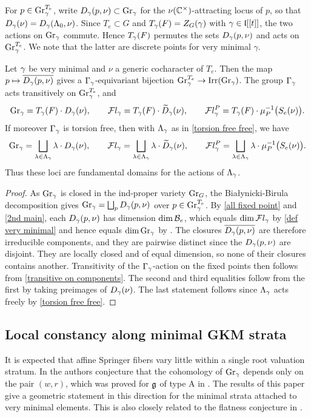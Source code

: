 \documentclass[11pt]{article}
\numberwithin{equation}{section}
\begin{document}
For $p\in\operatorname{Gr}_\gamma^{T_e}$, write $D_\gamma(p,\nu)\subset\operatorname{Gr}_\gamma$ for the
$\nu(\mathbb{C}^\times)$-attracting locus of $p$, so that $D_\gamma(\nu)=D_\gamma(\Lambda_0,\nu)$.
Since $T_e\subset G$ and $T_\gamma(F)=Z_G(\gamma)$ with $\gamma\in\mathfrak{l}[[t]]$, the two
actions on $\operatorname{Gr}_\gamma$ commute. Hence $T_\gamma(F)$ permutes the sets $D_\gamma(p,\nu)$ and
acts on $\operatorname{Gr}_\gamma^{T_e}$. We note that the latter are discrete points for very minimal $\gamma$.

\begin{pro}\label{fundamental domain}
Let $\gamma$ be very minimal and $\nu$ a generic cocharacter of $T_e$. Then the map
$p\mapsto\overline{D_\gamma(p,\nu)}$ gives a $\Gamma_\gamma$-equivariant bijection
$\operatorname{Gr}_\gamma^{T_e}\to\operatorname{Irr}(\operatorname{Gr}_\gamma)$. The group $\Gamma_\gamma$ acts transitively on
$\operatorname{Gr}_\gamma^{T_e}$, and
\[
\operatorname{Gr}_\gamma=T_\gamma(F)\cdot D_\gamma(\nu),\qquad
\mathcal{F}l_\gamma=T_\gamma(F)\cdot\widetilde D_\gamma(\nu),\qquad
\mathcal{F}l_\gamma^P=T_\gamma(F)\cdot\mu_P^{-1}\bigl(S_e(\nu)\bigr).
\]
If moreover $\Gamma_\gamma$ is torsion free, then with $\Lambda_\gamma$ as in
\cref{torsion free free}, we have
\[
\operatorname{Gr}_\gamma=\bigsqcup_{\lambda\in\Lambda_\gamma}\lambda\cdot D_\gamma(\nu),\qquad
\mathcal{F}l_\gamma=\bigsqcup_{\lambda\in\Lambda_\gamma}\lambda\cdot\widetilde D_\gamma(\nu),\qquad
\mathcal{F}l_\gamma^P=\bigsqcup_{\lambda\in\Lambda_\gamma}\lambda\cdot\mu_P^{-1}\bigl(S_e(\nu)\bigr).
\]
Thus these loci are fundamental domains for the actions of $\Lambda_\gamma$.
\end{pro}
\begin{proof}
As $\operatorname{Gr}_\gamma$ is closed in the ind-proper variety $\operatorname{Gr}_G$, the Bia\l ynicki-Birula decomposition gives
$\operatorname{Gr}_\gamma=\bigsqcup_{p}D_\gamma(p,\nu)$ over $p\in\operatorname{Gr}_\gamma^{T_e}$. By
\cref{all fixed point} and \cref{2nd main}, each $D_\gamma(p,\nu)$ has
dimension $\dim\mathcal{B}_e$, which equals $\dim\mathcal{F}l_\gamma$ by \cref{def very minimal} and
hence equals $\dim\operatorname{Gr}_\gamma$ by \cite[\S4, Corollary 2]{KL88}. The closures
$\overline{D_\gamma(p,\nu)}$ are therefore irreducible components, and they are
pairwise distinct since the $D_\gamma(p,\nu)$ are disjoint. They are locally closed and of
equal dimension, so none of their closures contains another. Transitivity of the
$\Gamma_\gamma$-action on the fixed points then follows from
\cref{transitive on components}. The second and third equalities follow from the
first by taking preimages of $D_\gamma(\nu)$. The last statement follows since $\Lambda_\gamma$ acts freely by
\cref{torsion free free}.
\end{proof}
\subsection{Local constancy along minimal GKM strata}
It is expected that affine Springer fibers vary little within a single root
valuation stratum. In \cite{GKMstrat} the authors conjecture that the cohomology
of $\operatorname{Gr}_\gamma$ depends only on the pair $(w,r)$, which was proved for $\mathfrak{g}$ of
type A in \cite{Chen24}. The results of this paper give a geometric statement in
this direction for the minimal strata attached to very minimal elements. This is also closely related to the flatness conjecture in \cite[Section 6]{FKV}.
\end{document}
